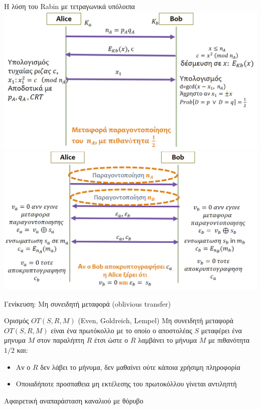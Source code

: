 \documentclass[handout]{beamer}
\begin{document}
\begin{frame}[allowframebreaks]{Η λύση του Rabin με τετραγωνικά υπόλοιπα}
	\includegraphics[scale=0.4]{rabinQR.png}
	\framebreak
	\includegraphics[scale=0.4]{rabinEOS.png}
\end{frame}

\begin{frame}{Γενίκευση: Μη συνειδητή μεταφορά (oblivious transfer)}
\begin{block}{Ορισμός $OT(S,R,M)$ (Even, Goldreich, Lempel)}
	Μη συνειδητή μεταφορά $OT(S,R,M)$ είναι ένα πρωτόκολλο με το οποίο ο αποστολέας $S$ μεταφέρει ένα μηνυμα $M$ στον παραλήπτη $R$ έτσι ώστε ο $R$ λαμβάνει το μήνυμα $Μ$ με πιθανότητα $1/2$ και:
	\begin{itemize}
		\item Αν ο $R$ δεν λάβει το μήνυμα, δεν μαθαίνει ούτε κάποια χρήσιμη πληροφορία
		\item Οποιαδήποτε προσπαθεια μη εκτέλεσης του πρωτοκόλλου γίνεται αντιληπτή
	\end{itemize}
\end{block}
Αφαιρετική αναπαράσταση καναλιού με θόρυβο
\end{frame}
\end{document}
